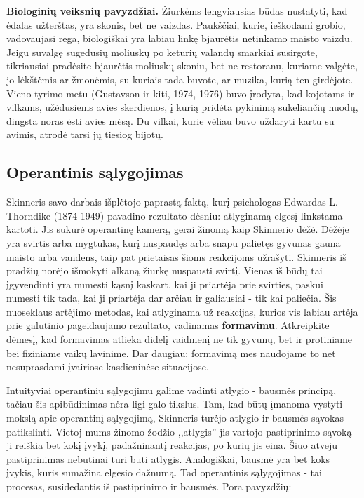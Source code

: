 \documentclass{article}
\begin{document}
\textbf{Biologinių veiksnių pavyzdžiai.} Žiurkėms lengviausias būdas nustatyti, kad ėdalas užterštas, yra skonis, bet ne vaizdas. Paukščiai, kurie, ieškodami grobio, vadovaujasi rega, biologiškai yra labiau linkę bjaurėtis netinkamo maisto vaizdu. Jeigu suvalgę sugedusių moliuskų po keturių valandų smarkiai susirgote, tikriausiai pradėsite bjaurėtis moliuskų skoniu, bet ne restoranu, kuriame valgėte, jo lėkštėmis ar žmonėmis, su kuriais tada buvote, ar muzika, kurią ten girdėjote. Vieno tyrimo
metu (Gustavson ir kiti, 1974, 1976) buvo įrodyta, kad kojotams ir vilkams, užėdusiems avies skerdienos, į kurią pridėta pykinimą sukeliančių nuodų, dingsta noras ėsti avies mėsą. Du vilkai, kurie vėliau buvo uždaryti kartu su avimis, atrodė tarsi jų tiesiog bijotų.

\subsection{Operantinis sąlygojimas}

Skinneris savo darbais išplėtojo paprastą faktą, kurį psichologas Edwardas L. Thorndike (1874-1949) pavadino rezultato dėsniu: atlyginamą elgesį linkstama kartoti. Jis sukūrė operantinę kamerą, gerai žinomą kaip Skinnerio dėžė. Dėžėje yra svirtis arba mygtukas, kurį nuspaudęs arba snapu palietęs gyvūnas gauna maisto arba vandens, taip pat prietaisas šioms reakcijoms užrašyti. Skinneris iš pradžių norėjo išmokyti alkaną žiurkę nuspausti svirtį. Vienas iš būdų tai įgyvendinti yra numesti kąsnį kaskart, kai ji priartėja prie svirties, paskui numesti tik tada, kai ji priartėja dar arčiau ir galiausiai - tik kai paliečia. Šis nuoseklaus artėjimo metodas, kai atlyginama už reakcijas, kurios vis labiau artėja prie galutinio pageidaujamo rezultato, vadinamas \textbf{formavimu}. Atkreipkite dėmesį, kad formavimas atlieka didelį vaidmenį ne tik gyvūnų, bet ir protiniame bei fiziniame vaikų lavinime. Dar daugiau: formavimą mes naudojame to net nesuprasdami įvairiose kasdieninėse situacijose.

Intuityviai operantiniu sąlygojimu galime vadinti atlygio - bausmės principą, tačiau šis apibūdinimas nėra ligi galo tikslus. Tam,  kad būtų įmanoma vystyti mokslą apie operantinį sąlygojimą, Skinneris turėjo atlygio ir bausmės sąvokas patikslinti. Vietoj mums žinomo žodžio ,,atlygis'' jis vartojo pastiprinimo sąvoką - ji reiškia bet kokį įvykį, padažninantį reakcijas, po
kurių jis eina. Šiuo atveju pastiprinimas nebūtinai turi būti atlygis. Analogiškai, bausmė yra bet koks įvykis, kuris sumažina elgesio dažnumą. Tad operantinis sąlygojimas - tai procesas, susidedantis iš pastiprinimo ir bausmės. Pora pavyzdžių:
\end{document}
